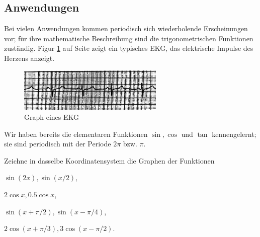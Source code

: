 \documentclass[%
11pt,%
twoside,%
titlepage,%
german,%
headsepline%
]{scrartcl}
\begin{document}
\subsection{Anwendungen}
Bei
vielen Anwendungen kommen periodisch sich wiederholende Erscheinungen vor; für ihre mathematische Beschreibung sind die trigonometrischen Funktionen zuständig. Figur \ref{ekg} auf Seite \pageref{ekg} zeigt ein typisches EKG, das elektrische Impulse des Herzens anzeigt.

\begin{figure}
\begin{center}
\includegraphics[width=0.618\textwidth]{pictures/ekg}
\end{center}
\caption{Graph eines EKG}\label{ekg}
\end{figure}


Wir haben bereits die elementaren Funktionen $\sin, \cos$ und $\tan$ kennengelernt; sie sind periodisch mit der Periode $2\pi$ bzw. $\pi$.

\begin{ueb}
Zeichne in dasselbe Koordinatensystem die Graphen der Funktionen
\begin{enumeratea}
\item $\sin(2x), \sin(x/2)$,
\item $2\cos x, 0.5\cos x$,
\item $\sin(x + \pi/2), \sin(x - \pi/4)$,
\item $2\cos(x + \pi/3), 3\cos(x - \pi/2)$.
\end{enumeratea}
\end{ueb}


\end{document}
